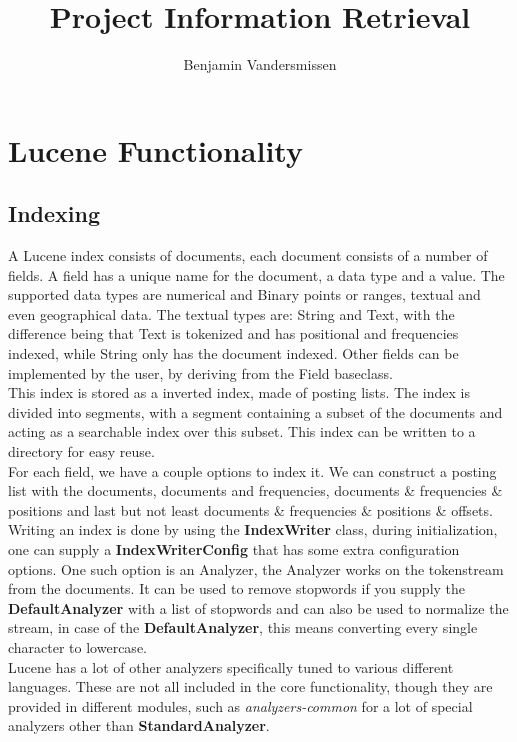 \documentclass{article}
\begin{document}
\title{Project Information Retrieval}
\author{Benjamin Vandersmissen}
\maketitle
\section{Lucene Functionality}
\subsection{Indexing}
A Lucene index consists of documents, each document consists of a number of fields. A field has a unique name for the document, a data type and a value. The supported data types are numerical and Binary points or ranges, textual and even geographical data. The textual types are: String and Text, with the difference being that Text is tokenized and has positional and frequencies indexed, while String only has the document indexed. Other fields can be implemented by the user, by deriving from the Field baseclass.\\

This index is stored as a inverted index, made of posting lists. The index is divided into segments, with a segment containing a subset of the documents and acting as a searchable index over this subset. This index can be written to a directory for easy reuse.\\

For each field, we have a couple options to index it. We can construct a posting list with the documents, documents and frequencies, documents \& frequencies \& positions and last but not least documents \& frequencies \& positions \& offsets.\\

Writing an index is done by using the \textbf{IndexWriter} class, during initialization, one can supply a \textbf{IndexWriterConfig} that has some extra configuration options. One such option is an Analyzer, the Analyzer works on the tokenstream from the documents. It can be used to remove stopwords if you supply the \textbf{DefaultAnalyzer} with a list of stopwords and can also be used to normalize the stream, in case of the \textbf{DefaultAnalyzer}, this means converting every single character to lowercase. \\

Lucene has a lot of other analyzers specifically tuned to various different languages. These are not all included in the core functionality, though they are provided in different modules, such as \textit{analyzers-common} for a lot of special analyzers other than \textbf{StandardAnalyzer}.
\end{document}
